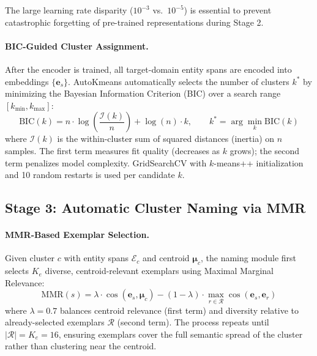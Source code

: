 \documentclass[11pt,a4paper]{article}
\begin{document}
The large learning rate disparity ($10^{-3}$ vs.\ $10^{-5}$) is essential to prevent catastrophic forgetting of pre-trained representations during Stage 2.

\paragraph{BIC-Guided Cluster Assignment.}
After the encoder is trained, all target-domain entity spans are encoded into embeddings $\{\mathbf{e}_s\}$. AutoKmeans automatically selects the number of clusters $k^*$ by minimizing the Bayesian Information Criterion (BIC) over a search range $[k_{\min}, k_{\max}]$:
\begin{equation}
  \text{BIC}(k) = n\cdot\log\!\left(\frac{\mathcal{I}(k)}{n}\right) + \log(n)\cdot k, \qquad
  k^* = \arg\min_k \text{BIC}(k)
\end{equation}
where $\mathcal{I}(k)$ is the within-cluster sum of squared distances (inertia) on $n$ samples. The first term measures fit quality (decreases as $k$ grows); the second term penalizes model complexity. GridSearchCV with $k$-means++ initialization and 10 random restarts is used per candidate $k$.

\subsection{Stage 3: Automatic Cluster Naming via MMR}

\paragraph{MMR-Based Exemplar Selection.}
Given cluster $c$ with entity spans $\mathcal{E}_c$ and centroid $\boldsymbol{\mu}_c$, the naming module first selects $K_e$ diverse, centroid-relevant exemplars using Maximal Marginal Relevance:
\begin{equation}
  \text{MMR}(s) = \lambda\cdot\cos(\mathbf{e}_s, \boldsymbol{\mu}_c) - (1-\lambda)\cdot\max_{r\in\mathcal{R}}\cos(\mathbf{e}_s,\mathbf{e}_r)
  \label{eq:mmr}
\end{equation}
where $\lambda = 0.7$ balances centroid relevance (first term) and diversity relative to already-selected exemplars $\mathcal{R}$ (second term). The process repeats until $|\mathcal{R}| = K_e = 16$, ensuring exemplars cover the full semantic spread of the cluster rather than clustering near the centroid.
\end{document}
